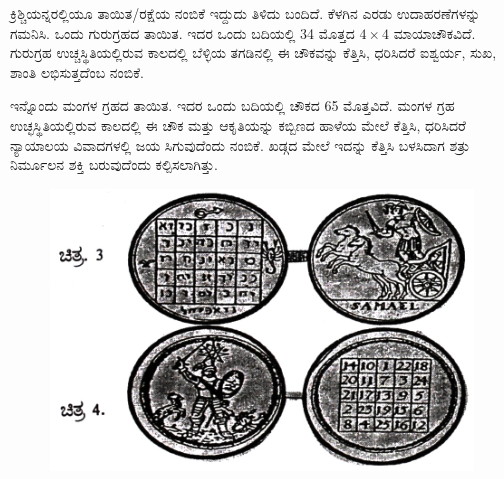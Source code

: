 ಕ್ರಿಶ್ಚಿಯನ್ನರಲ್ಲಿಯೂ ತಾಯಿತ/ರಕ್ಷೆಯ ನಂಬಿಕೆ ಇದ್ದುದು ತಿಳಿದು ಬಂದಿದೆ. ಕೆಳಗಿನ \linebreak ಎರಡು ಉದಾಹರಣೆಗಳನ್ನು ಗಮನಿಸಿ. ಒಂದು ಗುರುಗ್ರಹದ ತಾಯಿತ. ಇದರ ಒಂದು ಬದಿಯಲ್ಲಿ 34 ಮೊತ್ತದ $4 \times 4$ ಮಾಯಾಚೌಕವಿದೆ. ಗುರುಗ್ರಹ ಉಚ್ಚಸ್ಥಿತಿಯಲ್ಲಿರುವ ಕಾಲದಲ್ಲಿ ಬೆಳ್ಳಿಯ ತಗಡಿನಲ್ಲಿ ಈ ಚೌಕವನ್ನು ಕೆತ್ತಿಸಿ, ಧರಿಸಿದರೆ ಐಶ್ವರ್ಯ, ಸುಖ, ಶಾಂತಿ ಲಭಿಸುತ್ತದೆಂಬ ನಂಬಿಕೆ.

\medskip
ಇನ್ನೊಂದು ಮಂಗಳ ಗ್ರಹದ ತಾಯಿತ. ಇದರ ಒಂದು ಬದಿಯಲ್ಲಿ ಚೌಕದ 65 \linebreak ಮೊತ್ತವಿದೆ. ಮಂಗಳ ಗ್ರಹ ಉಚ್ಛಸ್ಥಿತಿಯಲ್ಲಿರುವ ಕಾಲದಲ್ಲಿ ಈ ಚೌಕ ಮತ್ತು ಆಕೃತಿಯನ್ನು \linebreak ಕಬ್ಬಿಣದ ಹಾಳೆಯ ಮೇಲೆ ಕೆತ್ತಿಸಿ, ಧರಿಸಿದರೆ ನ್ಯಾಯಾಲಯ ವಿವಾದಗಳಲ್ಲಿ ಜಯ ಸಿಗುವುದೆಂದು ನಂಬಿಕೆ. ಖಡ್ಗದ ಮೇಲೆ ಇದನ್ನು ಕೆತ್ತಿಸಿ ಬಳಸಿದಾಗ ಶತ್ರು ನಿರ್ಮೂಲನ ಶಕ್ತಿ ಬರುವುದೆಂದು ಕಲ್ಪಿಸಲಾಗಿತ್ತು.

\begin{figure}[H]
\includegraphics{src/figures/chap11/fig11-2.jpg}
\end{figure}

